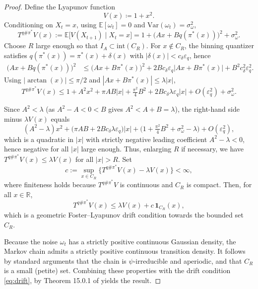 \documentclass{article}
\begin{document}
\begin{proof}

Define the Lyapunov function
\begin{equation*}
    V(x) \coloneqq  1 + x^2.
\end{equation*}
Conditioning on $X_t=x$, using $\mathbb{E}[\omega_t]=0$ and $\mathrm{Var}(\omega_t)=\sigma_\omega^2$,
\[
T^{q\#\pi^*}V(x)
:=
\mathbb{E}\bigl[V(X_{t+1})\mid X_t=x\bigr]
= 1 + \bigl(Ax + Bq(\pi^*(x))\bigr)^2 + \sigma_\omega^2.
\]
Choose $R$ large enough so that $I_A \subset \mathrm{int}(C_R)$.
For $x\notin C_R$, the binning quantizer satisfies $q(\pi^*(x))=\pi^*(x)+\delta(x)$
with $|\delta(x)|<c_\delta\varepsilon_q$, hence
\begin{align*}
\bigl(Ax+Bq(\pi^*(x))\bigr)^2
&\leq \bigl(Ax+B\pi^*(x)\bigr)^2
     + 2Bc_\delta\varepsilon_q\bigl|Ax+B\pi^*(x)\bigr|
     + B^2c_\delta^2\varepsilon_q^2.
\end{align*}
Using $|\arctan(x)|\le\pi/2$ and $|Ax+B\pi^*(x)|\le\lambda|x|$,
\begin{equation*}
    T^{q\#\pi^*}V(x)
\le
1 + A^2x^2 + \pi AB|x| + \tfrac{\pi^2}{4}B^2
  + 2Bc_\delta\lambda\varepsilon_q|x|
  + O(\varepsilon_q^2) + \sigma_\omega^2.
\end{equation*}

Since $A^2<\lambda$ (as $A^2-A<0<B$ gives $A^2<A+B=\lambda$), the right-hand side minus $\lambda V(x)$ equals
\begin{equation*}
    (A^2-\lambda)x^2 + \bigl(\pi AB+2Bc_\delta\lambda\varepsilon_q\bigr)|x|
+ \bigl(1+\tfrac{\pi^2}{4}B^2+\sigma_\omega^2-\lambda\bigr) + O(\varepsilon_q^2),
\end{equation*}
which is a quadratic in $|x|$ with strictly negative leading coefficient $A^2-\lambda<0$,
hence negative for all $|x|$ large enough.
Thus, enlarging $R$ if necessary, we have $T^{q\#\pi^*}V(x)\le\lambda V(x)$ for all $|x|>R$.
Set
\begin{equation*}
    c := \sup_{x\in C_R}\bigl\{T^{q\#\pi^*}V(x)-\lambda V(x)\bigr\} < \infty,
\end{equation*}
where finiteness holds because $T^{q\#\pi^*}V$ is continuous and $C_R$ is compact.
Then, for all $x\in\mathbb{R}$,
\begin{equation}\label{eq:drift}
    T^{q\#\pi^*}V(x) \le \lambda V(x) + c\,\mathbf{1}_{C_R}(x),
\end{equation}
which is a geometric Foster--Lyapunov drift condition towards the bounded set $C_R$.


Because the noise $\omega_t$ has a strictly positive continuous Gaussian density, the Markov chain admits a strictly positive continuous transition density. It follows by standard arguments that the chain is $\psi$-irreducible and aperiodic, and that $C_R$ is a small (petite) set. Combining these properties with the drift condition \eqref{eq:drift}, by Theorem 15.0.1 of \citet{meyn2012markov} yields the result.
\end{proof}
\end{document}
